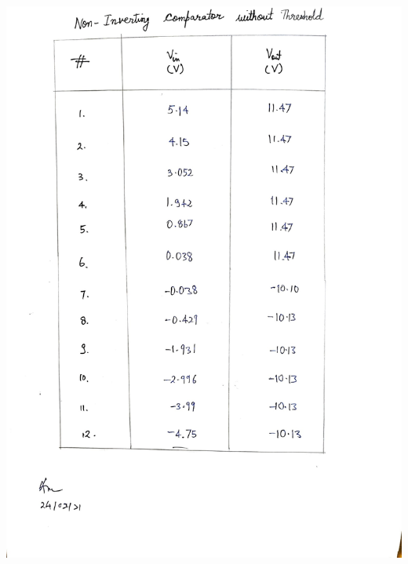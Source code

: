 \begin{center}
    \includegraphics[scale = 0.28]{OPAMP Apps/noninvcomp.jpg}
\end{center}
\clearpage
